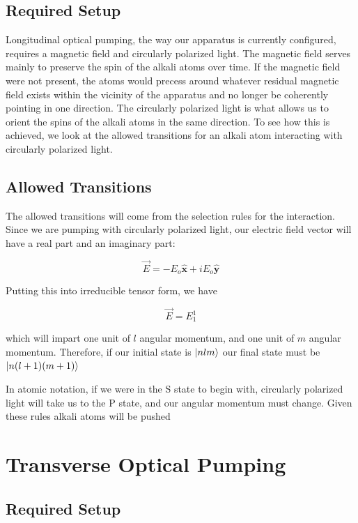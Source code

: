 \documentclass[12pt]{article}
\newcommand{\xhat}{\hat{\textbf{x}}}
\newcommand{\yhat}{\hat{\textbf{y}}}
\begin{document}
	\subsection{Required Setup}
    Longitudinal optical pumping, the way our apparatus is 
    currently configured, requires a magnetic field and
    circularly polarized light. The magnetic field
	serves mainly to preserve the spin of the alkali
	atoms over time. If the magnetic field were not 
	present, the atoms would precess around whatever
	residual magnetic field exists within the vicinity
	of the apparatus and no longer be coherently pointing
	in one direction. The circularly polarized light
	is what allows us to orient the spins of the alkali
	atoms in the same direction. To see how this is
	achieved, we look at the allowed transitions for
	an alkali atom interacting with circularly polarized
	light. 

	\subsection{Allowed Transitions}
	The allowed transitions will come from the selection
	rules for the interaction. Since we are pumping with
	circularly polarized light, our electric field vector
	will have a real part and an imaginary part:
	
	\begin{equation}
		\vec{E}=-E_o \xhat  +iE_o \yhat 
	\end{equation}

	Putting this into irreducible tensor form, we have 

	\begin{equation}
		\vec{E}=E_1^1
	\end{equation}

	which will impart one unit of $l$ angular momentum,
	and one unit of $m$ angular momentum. Therefore, if
	our initial state is $\ket{nlm}$ our final state must
	be $\ket{n(l+1)(m+1)}$

	In atomic notation, if we were in the S state to begin
	with, circularly polarized light will take us to the
	P state, and our angular momentum must change. Given
	these rules alkali atoms will be pushed 

\section{Transverse Optical Pumping}

	\subsection{Required Setup}
\end{document}
